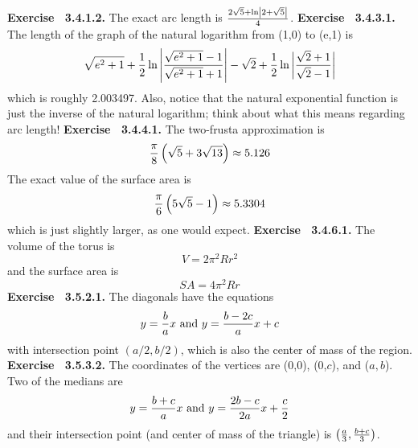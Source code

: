  {\noindent \protect \bf  Exercise ~3.4.1.2.} The exact arc length is $\protect \frac  {2\protect \sqrt  {5}+\protect \qopname  \relax o{ln}\left | 2+\protect \sqrt  {5}\right |}{4}$. \protect \newline  \protect \newline  
 {\noindent \protect \bf  Exercise ~3.4.3.1.} The length of the graph of the natural logarithm from (1,0) to (e,1) is $$\protect \sqrt  {e^2+1}+\protect \frac  {1}{2}\protect \qopname  \relax o{ln}\left | \protect \frac  {\protect \sqrt  {e^2+1}-1}{\protect \sqrt  {e^2+1}+1}\right |-\protect \sqrt  {2}+\protect \frac  {1}{2}\protect \qopname  \relax o{ln}\left | \protect \frac  {\protect \sqrt  {2}+1}{\protect \sqrt  {2}-1}\right | $$ which is roughly 2.003497. Also, notice that the natural exponential function is just the inverse of the natural logarithm; think about what this means regarding arc length! \protect \newline  \protect \newline  
 {\noindent \protect \bf  Exercise ~3.4.4.1.} The two-frusta approximation is $$\protect \frac  {\pi }{8}\left (\protect \sqrt  {5}+3\protect \sqrt  {13} \right )\approx 5.126 $$ The exact value of the surface area is $$\protect \frac  {\pi }{6}\left (5\protect \sqrt  {5}-1 \right )\approx 5.3304 $$ which is just slightly larger, as one would expect.  \protect \newline  \protect \newline  
 {\noindent \protect \bf  Exercise ~3.4.6.1.} The volume of the torus is $$V=2\pi ^2Rr^2 $$ and the surface area is $$SA=4\pi ^2Rr $$ \protect \newline  \protect \newline  
 {\noindent \protect \bf  Exercise ~3.5.2.1.} The diagonals have the equations $$ y=\protect \frac  {b}{a}x \protect \text  { and } y=\protect \frac  {b-2c}{a}x+c$$ with intersection point $(a/2,b/2)$, which is also the center of mass of the region. \protect \newline  \protect \newline  
 {\noindent \protect \bf  Exercise ~3.5.3.2.} The coordinates of the vertices are (0,0), (0,$c$), and ($a,b$). Two of the medians are $$y=\protect \frac  {b+c}{a}x \protect \text  { and } y=\protect \frac  {2b-c}{2a}x+\protect \frac  {c}{2}$$ and their intersection point (and center of mass of the triangle) is $\left (\protect \frac  {a}{3},\protect \frac  {b+c}{3}\right )$. \protect \newline  \protect \newline  
